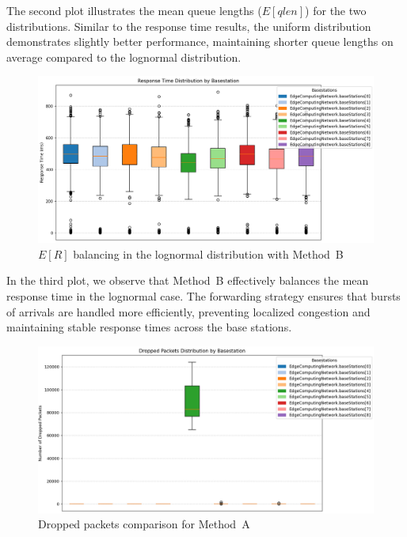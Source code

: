 \documentclass{report}
\begin{document}
\begin{flushleft}
The second plot illustrates the mean queue lengths ($E[qlen]$) for the two distributions. Similar to the response time results, the uniform distribution demonstrates slightly better performance, maintaining shorter queue lengths on average compared to the lognormal distribution.
\end{flushleft}

\begin{figure}[H]
    \centering
    \includegraphics[width=\textwidth]{img/plots/I-vary/Q_Box_Log_B_I01.png}
    \caption{$E[R]$ balancing in the lognormal distribution with Method~B}
\end{figure}

\begin{flushleft}
In the third plot, we observe that Method~B effectively balances the mean response time in the lognormal case. The forwarding strategy ensures that bursts of arrivals are handled more efficiently, preventing localized congestion and maintaining stable response times across the base stations.
\end{flushleft}

\begin{figure}[H]
    \centering
    \includegraphics[width=\textwidth]{img/plots/I-vary/D_Box_Log_A_I05.png}
    \caption{Dropped packets comparison for Method~A}
\end{figure}
\end{document}
